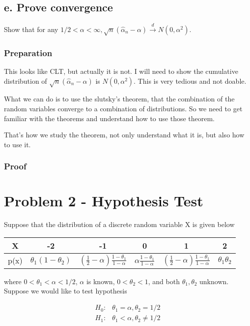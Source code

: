 \documentclass[11pt]{article} %
\begin{document}
\subsection{e. Prove convergence}
Show that for any $1/2 < \alpha < \infty, \sqrt{n} (\hat{\alpha}_n - \alpha) \xrightarrow {d} N(0, \alpha^2)$.

\subsubsection{Preparation}
This looks like CLT, but actually it is not. I will need to show the cumulative distribution of $\sqrt{n} (\hat{\alpha}_n - \alpha) $ is $N(0, \alpha^2)$. This is very tedious and not doable. 

What we can do is to use the slutsky's theorem, that the combination of the random variables converge to a combination of distributions. So we need to get familiar with the theorems and understand how to use those theorem. 

That's how we study the theorem, not only understand what it is, but also how to use it.

\subsubsection{Proof}



\section{Problem 2 - Hypothesis Test}
Suppose that the distribution of a discrete random variable X is given below

\begin{center}
\begin{tabular}{ c c c c c c}
 X & -2 & -1 & 0 & 1 & 2 \\ 
 \hline
p(x) & $\theta_1(1-\theta_2)$ & $(\frac{1}{2} - \alpha) \frac{1-\theta_1}{1-\alpha} $ & $ \alpha \frac{1-\theta_1}{1-\alpha} $ & $(\frac{1}{2} - \alpha) \frac{1-\theta_1}{1-\alpha}$ & $ \theta_1 \theta_2$ \\  
\end{tabular}
\end{center}

 where $0< \theta_1 < \alpha < 1/2$, $\alpha$ is known, $0< \theta_2 < 1$, and both $\theta_1, \theta_2$ unknown. Suppose we would like to test hypothesis

\begin{align*}
	H_0: &  \theta_1 = \alpha, \theta_2 = 1/2 \\
	H_1: &  \theta_1 < \alpha, \theta_2  \neq 1/2
\end{align*} 
\end{document}

